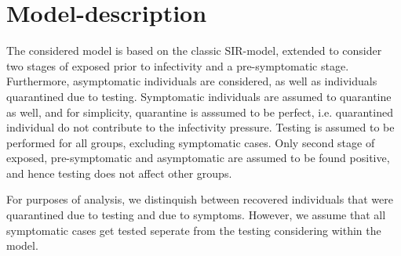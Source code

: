 \documentclass[10pt,a4paper]{article}
\begin{document}



\section{Model-description}

The considered model is based on the classic SIR-model, 
extended to consider two stages of exposed prior to infectivity and a pre-symptomatic stage. 
Furthermore, asymptomatic individuals are considered, as well as individuals quarantined due to testing.
Symptomatic individuals are assumed to quarantine as well, and for simplicity, quarantine is asssumed to be perfect, i.e. quarantined individual do not contribute to the infectivity pressure.
Testing is assumed to be performed for all groups, excluding symptomatic cases. Only second stage of exposed, pre-symptomatic and asymptomatic are assumed to be found positive, and hence testing does not affect other groups. 

For purposes of analysis, we distinquish between recovered individuals that were quarantined due to testing and due to symptoms. However, we assume that all symptomatic cases get tested seperate from the testing considering within the model.
\end{document}
